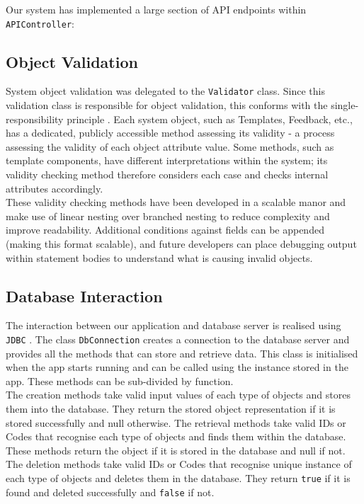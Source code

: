 \documentclass[9pt, titlepage]{extarticle}
\begin{document}
Our system has implemented a large section of API endpoints within \texttt{APIController}: 

\subsection{Object Validation}

System object validation was delegated to the \texttt{Validator} class. Since this validation class is responsible for object validation, this conforms with the single-responsibility principle \cite{srdp}. Each system object, such as Templates, Feedback, etc., has a dedicated, publicly accessible method assessing its validity - a process assessing the validity of each object attribute value. Some methods, such as template components, have different interpretations within the system; its validity checking method therefore considers each case and checks internal attributes accordingly. \\

These validity checking methods have been developed in a scalable manor and make use of linear nesting over branched nesting to reduce complexity and improve readability. Additional conditions against fields can be appended (making this format scalable), and future developers can place debugging output within statement bodies to understand what is causing invalid objects. 

\subsection{Database Interaction}

The interaction between our application and database server is realised using \texttt{JDBC} \cite{jdbc}. The class \texttt{DbConnection} creates a connection to the database server and provides all the methods that can store and retrieve data. This class is initialised when the app starts running and can be called using the instance stored in the app. These methods can be sub-divided by function. \\

The creation methods take valid input values of each type of objects and stores them into the database. They return the stored object representation if it is stored successfully and null otherwise. The retrieval methods take valid IDs or Codes that recognise each type of objects and finds them within the database. These methods return the object if it is stored in the database and null if not. The deletion methods take valid IDs or Codes that recognise unique instance of each type of objects and deletes them in the database. They return \texttt{true} if it is found and deleted successfully and \texttt{false} if not. \\
\end{document}

